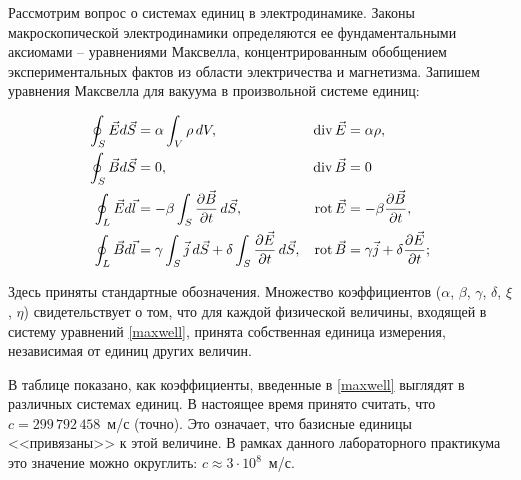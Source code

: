 Рассмотрим вопрос о системах единиц в электродинамике. Законы макроскопической электродинамики определяются ее фундаментальными аксиомами -- уравнениями Максвелла, концентрированным обобщением экспериментальных фактов из области электричества и магнетизма. Запишем уравнения Максвелла для вакуума в произвольной системе единиц:



\begin{gather}
	\eqmark[maxwell]
	\begin{aligned}
		\oint_S \vec{E}d\vec{S} &= \alpha\int_V\rho\,dV, & \Div \vec{E} &= \alpha\rho,\\
		\oint_S\vec{B}d\vec{S} &= 0, & \Div\vec{B} &= 0\\
		\oint_L\vec{E}d\vec{l} &= -\beta\int_S\frac{\partial{\vec{B}}} {\partial t}\,d\vec{S}, & \Rot\vec{E} &= -\beta\frac{\partial\vec B}{\partial t},\\
		\oint_L\vec{B}d\vec{l} &= \gamma\int_S\vec{j}\,d\vec{S}+\delta\int_S\frac{\partial{\vec{E}}}{\partial t}\,d\vec{S}, & \Rot\vec{B} &= \gamma\vec{j}+\delta\frac{\partial\vec E}{\partial t};
	\end{aligned}
\end{gather}

Здесь приняты стандартные обозначения. Множество коэффициентов ($\alpha$, $\beta$, $\gamma$, $\delta$, $\xi$, $\eta$) свидетельствует о том, что для
каждой физической величины, входящей в систему уравнений \eqref{maxwell}, принята собственная единица измерения,
независимая от единиц других величин.


В таблице  показано, как коэффициенты, введенные в \eqref{maxwell} выглядят в различных системах единиц. В
настоящее время принято считать, что $c=299\,792\,458$~м/с (точно). Это означает, что базисные единицы <<привязаны>> к
этой величине. В рамках данного лабораторного практикума это значение можно округлить: $c \approx 3 \cdot 10^8$~м/с.

\def\pp{\textbf}

